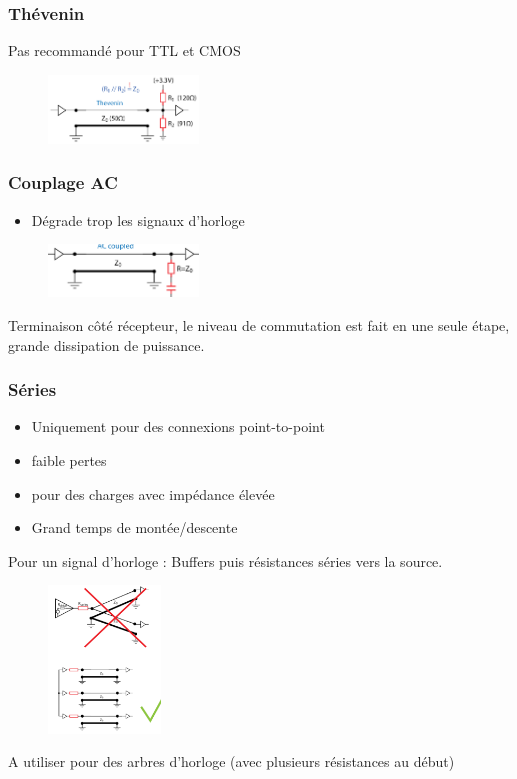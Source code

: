 \documentclass[resume]{subfiles}
\begin{document}
\begin{multicols}{3}
\subsubsection{Thévenin}
Pas recommandé pour TTL et CMOS
\begin{figure}[H]
\centering
\includegraphics[width=4.00cm]{img_23.png}
\end{figure}
\subsubsection{Couplage AC}
\begin{itemize}
\item Dégrade trop les signaux d'horloge
\end{itemize}
\begin{figure}[H]
\centering
\includegraphics[width=4.00cm]{img_24.png}
\end{figure}
Terminaison côté récepteur, le niveau de commutation est fait en une seule étape, grande dissipation de puissance.
\subsubsection{Séries}
\begin{itemize}
\item Uniquement pour des connexions point-to-point
\item faible pertes
\item pour des charges avec impédance élevée
\item Grand temps de montée/descente
\end{itemize}
Pour un signal d'horloge : Buffers puis résistances séries vers la source.
\begin{figure}[H]
\centering
\includegraphics[width=3.00cm]{img_25.png}
\end{figure}
A utiliser pour des arbres d'horloge (avec plusieurs résistances au début)

\end{multicols}
\end{document}
